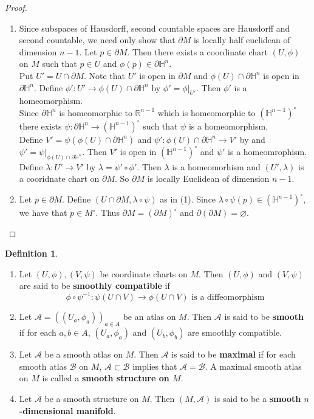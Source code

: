 \documentclass[12pt]{amsart}
\theoremstyle{definition}
\newtheorem{defn}[definition]{Definition}
\theoremstyle{remark}
\theoremstyle{definition}
\newcommand{\lam}{\lambda}
\renewcommand{\H}{\mathbb{H}}
\newcommand{\R}{\mathbb{R}}
\newcommand{\MA}{\mathcal{A}}
\newcommand{\MB}{\mathcal{B}}
\begin{document}
	\begin{proof}
		\begin{enumerate}
			\item Since subspaces of Hausdorff, second countable spaces are Hausdorff and second countable, we need only show that $\partial M$ is locally half euclidean of dimension $n-1$. Let $p \in \partial M$. Then there exists a coordinate chart $(U, \phi)$ on $M$ such that $p \in U$ and $\phi(p) \in \partial \H^n$. \\
			Put $U' = U \cap \partial M$. Note that $U'$ is open in $\partial M$ and $ \phi(U) \cap \partial \H^n$ is open in $\partial \H^n$. Define  $\phi': U' \rightarrow \phi(U) \cap \partial \H^n$ by $\phi' = \phi|_{U'}$. Then $\phi'$ is a homeomorphism. \\
			Since $\partial \H^n$ is homeomorphic to $\R^{n-1}$ which is homeomorphic to $(\H^{n-1})^{\circ}$ there exists $\psi: \partial \H^n \rightarrow (\H^{n-1})^{\circ}$ such that $\psi$ is a homeomorphism.\\ 
			Define $V' = \psi(\phi(U) \cap \partial \H^n)$ and $\psi': \phi(U) \cap \partial \H^n \rightarrow V' $ by and $\psi' = \psi|_{\phi(U) \cap \partial \H^n}$. Then $V'$ is open in $(\H^{n-1})^{\circ}$ and $\psi'$ is a homeomrophism. \\ 
			Define $\lam : U' \rightarrow V'$ by $\lam = \psi' \circ \phi'$. Then $\lam$ is a homeomorhism and $(U', \lam) $ is a cooridnate chart on $\partial M$. So $\partial M$ is locally Euclidean of dimension $n-1$.  
			\item Let $p \in \partial M$. Define $(U \cap \partial M, \lam \circ \psi)$ as in (1). Since $\lam \circ \psi(p) \in (\H^{n-1})^{\circ}$, we have that $p \in M^{\circ}$. Thus $ \partial M = (\partial M)^{\circ}$ and $\partial (\partial M) = \varnothing$.
		\end{enumerate}
	\end{proof}

	\begin{defn}\
		\begin{enumerate}
			\item Let $(U, \phi), (V, \psi)$ be coordinate charts on $M$. Then $(U, \phi)$ and $(V, \psi)$ are said to be \textbf{smoothly compatible} if $$\phi \circ \psi^{-1}: \psi(U \cap V) \rightarrow \phi (U \cap V) \text{ is a diffeomorphism}$$ 
			\item Let $\MA = ((U_a,\phi_{a}))_{a \in A}$ be an atlas on $M$. Then $\MA$ is said to be \textbf{smooth} if for each $a,b \in A$, $(U_a,\phi_{a})$ and $(U_b,\phi_{b})$ are smoothly compatible.
			\item Let $\MA$ be a smooth atlas on $M$. Then $\MA$ is said to be \textbf{maximal} if for each smooth atlas $\MB$ on $M$, $\MA \subset \MB$ implies that $\MA = \MB$. A maximal smooth atlas on $M$ is called a \textbf{smooth structure on $M$}.
			\item Let $\MA$ be a smooth structure on $M$. Then $(M, \MA)$ is said to be a \textbf{smooth $n$-dimensional manifold}. 
		\end{enumerate}
	\end{defn}
\end{document}
